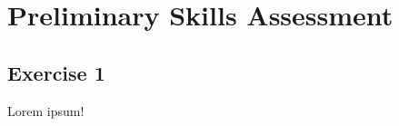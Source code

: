 \documentclass[fleqn]{article}
\begin{document}
\thispagestyle{firstpage}\vspace*{10pt}\section*{Preliminary Skills Assessment}\vspace*{10pt}\subsection*{Exercise 1}

Lorem ipsum!
\end{document}
